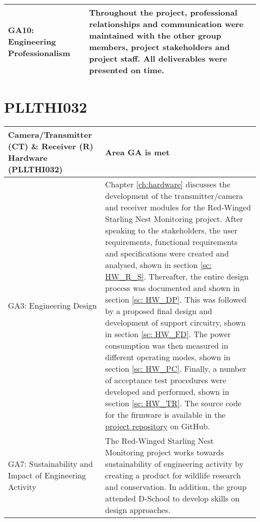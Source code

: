 \documentclass[class=report,11pt,crop=false]{standalone}
\begin{document}
\begin{tabularx}{\textwidth}{|p{} X|}
    GA10: Engineering Professionalism & Throughout the project, professional relationships and communication were maintained with the other group members, project stakeholders and project staff. All deliverables were presented on time. \\ \hline


\end{tabularx}
\raggedright


\section{PLLTHI032}

\centering
\begin{tabularx}{\textwidth}{|p{} X|}

    \hline
    \textbf{Camera/Transmitter (CT) \& Receiver (R) Hardware (PLLTHI032)}  & \textbf{Area GA is met} \\ \hline

    GA3: Engineering Design & Chapter \ref{ch:hardware} discusses the development of the transmitter/camera and receiver modules for the Red-Winged Starling Nest Monitoring project. After speaking to the stakeholders, the user requirements, functional requirements and specifications were created and analysed, shown in section \ref{sc: HW_R_S}. Thereafter, the entire design process was documented and shown in section \ref{sc: HW_DP}. This was followed by a proposed final design and development of support circuitry, shown in section \ref{sc: HW_FD}. The power consumption was then measured in different operating modes, shown in section \ref{sc: HW_PC}. Finally, a number of acceptance test procedures were developed and performed, shown in section \ref{sc: HW_TR}. The source code for the firmware is available in the \href{https://github.com/rothdu/EEE4113F-Group13-2024}{project repository} on GitHub. \\ \hline

    GA7: Sustainability and Impact of Engineering Activity & The Red-Winged Starling Nest Monitoring project works towards sustainability of engineering activity by creating a product for wildlife research and conservation.  In addition, the group attended D-School to develop skills on design approaches. \\ \hline


\end{tabularx}
\end{document}
